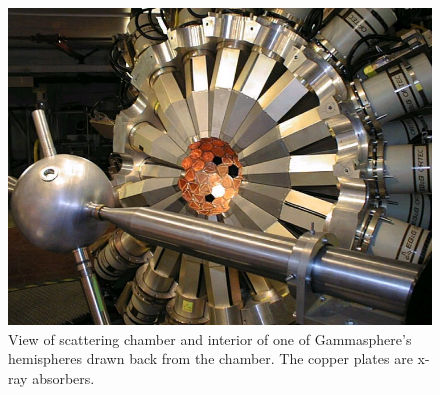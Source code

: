 \begin{figure}
	\centerline{\includegraphics[height=0.4\textheight]{./img/c3/gammasphere_hemi.jpg}}
	\caption{View of scattering chamber and interior of one of Gammasphere's hemispheres drawn back from the chamber. The copper plates are x-ray absorbers.}
	\label{fig:chp3-gs-hemisphere}
\end{figure}

